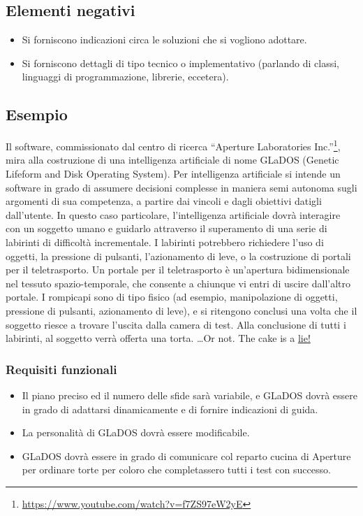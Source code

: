 \documentclass[a4paper,12pt]{report}
\begin{document}
\subsection*{Elementi negativi}
\begin{itemize}
	\item Si forniscono indicazioni circa le soluzioni che si vogliono adottare.
	\item Si forniscono dettagli di tipo tecnico o implementativo (parlando di classi, linguaggi di programmazione, librerie, eccetera).
\end{itemize}

\subsection*{Esempio}
Il software, commissionato dal centro di ricerca ``Aperture Laboratories Inc.''\footnote{
\url{https://www.youtube.com/watch?v=f7ZS97eW2yE}
}, mira alla costruzione di una intelligenza artificiale di nome GLaDOS (Genetic Lifeform and Disk Operating System).
%
Per intelligenza artificiale si intende un software in grado di assumere decisioni complesse in maniera semi autonoma sugli argomenti di sua competenza, a partire dai vincoli e dagli obiettivi datigli dall'utente.
%
In questo caso particolare, l'intelligenza artificiale dovrà interagire con un soggetto umano
e guidarlo attraverso il superamento di una serie di labirinti di difficoltà incrementale.
%
I labirinti potrebbero richiedere l'uso di oggetti, la pressione di pulsanti, l'azionamento di leve,
o la costruzione di portali per il teletrasporto.
%
Un portale per il teletrasporto è un'apertura bidimensionale nel tessuto spazio-temporale,
che consente a chiunque vi entri di uscire dall'altro portale.
%
I rompicapi sono di tipo fisico (ad
esempio, manipolazione di oggetti, pressione di pulsanti, azionamento di leve), e si ritengono
conclusi una volta che il soggetto riesce a trovare l'uscita dalla camera di test.
%
Alla conclusione di tutti i labirinti,
al soggetto verrà offerta una torta.
\textcolor{lie}{\ldots Or not. The cake is a \underline{lie!}}

\subsubsection{Requisiti funzionali}
\begin{itemize}
	\item Il piano preciso ed il numero delle sfide sarà variabile,
	e GLaDOS dovrà essere in grado di adattarsi dinamicamente e di fornire indicazioni di guida.
	\item La personalità di GLaDOS dovrà essere modificabile.
	\item GLaDOS dovrà essere in grado di comunicare col reparto cucina di Aperture
	per ordinare torte per coloro che completassero tutti i test con successo.
\end{itemize}
\end{document}
